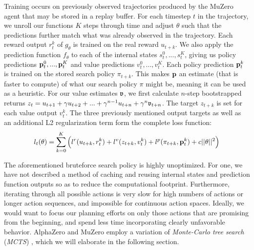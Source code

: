 Training occurs on previously observed trajectories produced by the MuZero agent that may be stored in a replay buffer. For each timestep $t$ in the trajectory, we unroll our functions $K$ steps through time and adjust $\theta$ such that the predictions further match what was already observed in the trajectory. Each reward output $r^k_t$ of $g_\theta$ is trained on the real reward $u_{t+k}$. We also apply the prediction function $f_\theta$ to each of the internal states $s^0_t, ..., s^K_t$, giving us policy predictions $\text{\textbf{p}}^0_t, ..., \text{\textbf{p}}^K_t$ and value predictions $v^0_t, ..., v^K_t$. Each policy prediction $\text{\textbf{p}}^k_t$ is trained on the stored search policy $\pi_{t+k}$. This makes $\text{\textbf{p}}$ an estimate (that is faster to compute) of what our search policy $\pi$ might be, meaning it can be used as a heuristic. For our value estimates $\mathfrak{v}$, we first calculate $n$-step bootstrapped returns $z_t = u_{t+1} + \gamma u_{t+2} + ... + \gamma^{n-1} u_{t+n} + \gamma^n\mathfrak{v}_{t+n}$. The target $z_{t+k}$ is set for each value output $v^k_t$. The three previously mentioned output targets as well as an additional L2 regularization term form the complete loss function:
\begin{equation*}
    l_t(\theta) = \sum^K_{k=0} \left(l^r(u_{t+k}, r_t^k) + l^v(z_{t+k}, v_t^k) + l^p(\pi_{t+k}, \text{\textbf{p}}_t^k) + c||\theta||^2\right)
\end{equation*}

The aforementioned bruteforce search policy is highly unoptimized. For one, we have not described a method of caching and reusing internal states and prediction function outputs so as to reduce the computational footprint. Furthermore, iterating through all possible actions is very slow for high numbers of actions or longer action sequences, and impossible for continuous action spaces. Ideally, we would want to focus our planning efforts on only those actions that are promising from the beginning, and spend less time incorporating clearly unfavorable behavior. AlphaZero and MuZero employ a variation of \textit{Monte-Carlo tree search} (\textit{MCTS}) \cite{mcts}, which we will elaborate in the following section.

